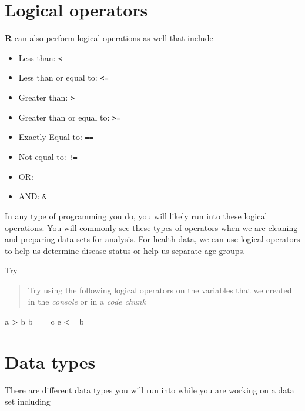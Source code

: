 \documentclass[
]{book}
\newenvironment{Shaded}{\begin{snugshade}}{\end{snugshade}}
\newcommand{\NormalTok}[1]{#1}
\newcommand{\SpecialCharTok}[1]{\textcolor[rgb]{0.00,0.00,0.00}{#1}}
\begin{document}
\hypertarget{logical-operators}{%
\section{Logical operators}\label{logical-operators}}

\textbf{R} can also perform logical operations as well that include

\begin{itemize}
\item
  Less than: \texttt{\textless{}}
\item
  Less than or equal to: \texttt{\textless{}=}
\item
  Greater than: \texttt{\textgreater{}}
\item
  Greater than or equal to: \texttt{\textgreater{}=}
\item
  Exactly Equal to: \texttt{==}
\item
  Not equal to: \texttt{!=}
\item
  OR: \texttt{\textbar{}}
\item
  AND: \texttt{\&}
\end{itemize}

In any type of programming you do, you will likely run into these logical operations. You will commonly see these types of operators when we are cleaning and preparing data sets for analysis. For health data, we can use logical operators to help us determine disease status or help us separate age groups.

Try

\begin{quote}
Try using the following logical operators on the variables that we created in the \emph{console} or in a \emph{code chunk}
\end{quote}

\begin{Shaded}
\begin{Highlighting}[]
\NormalTok{a }\SpecialCharTok{\textgreater{}}\NormalTok{ b}
\NormalTok{b }\SpecialCharTok{==}\NormalTok{ c}
\NormalTok{e }\SpecialCharTok{\textless{}=}\NormalTok{ b}
\end{Highlighting}
\end{Shaded}

\hypertarget{data-types}{%
\section{Data types}\label{data-types}}

There are different data types you will run into while you are working on a data set including
\end{document}
